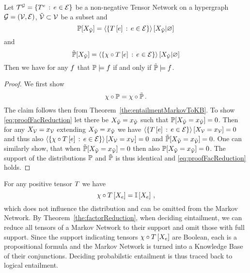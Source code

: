 \begin{theorem}\label{the:factorReduction}
	Let $\mathcal{T}^{\mathcal{G}}=\{T^{e}\, : \, e\in\mathcal{E}\}$ be a non-negative Tensor Network on a hypergraph $\mathcal{G}=(\mathcal{V},\mathcal{E})$, $\tilde{\mathcal{V}}\subset\mathcal{V}$ be a subset and
		\[ \mathbb{P}[X_{\tilde{\mathcal{V}}}] = \left\langle \{T\left[e\right] \, : \, e\in\mathcal{E} \}\right\rangle \left[ X_{\tilde{\mathcal{V}}} | \varnothing \right] \]
	and
		\[ \tilde{\mathbb{P}}[X_{\tilde{\mathcal{V}}}] = \left\langle \{\chi \circ T\left[e\right] \, : \, e\in\mathcal{E} \}\right\rangle \left[ X_{\tilde{\mathcal{V}}} | \varnothing \right] \]
	Then we have for any $f$ that $\mathbb{P}\models f$ if and only if $\tilde{\mathbb{P}}\models f$.
\end{theorem}
\begin{proof}
	We first show
	\begin{align}\label{eq:proofFacReduction}
		 \chi\circ\mathbb{P} = \chi\circ\tilde{\mathbb{P}} \, . 
	\end{align}
	The claim follows then from Theorem~\ref{the:entailmentMarkovToKB}.
	To show \eqref{eq:proofFacReduction} let there be $X_{\tilde{\mathcal{V}}}=x_{\tilde{\mathcal{V}}}$ such that $\mathbb{P}[X_{\tilde{\mathcal{V}}}=x_{\tilde{\mathcal{V}}}]=0$.
	Then for any $X_{\mathcal{V}}=x_{\mathcal{V}}$ extending  $X_{\tilde{\mathcal{V}}}=x_{\tilde{\mathcal{V}}}$ we have $\left\langle \{T\left[e\right] \, : \, e\in\mathcal{E} \}\right\rangle \left[ X_{\mathcal{V}}=x_{\mathcal{V}} \right] = 0$ and thus also $\left\langle \{\chi\circ T\left[e\right] \, : \, e\in\mathcal{E} \}\right\rangle \left[ X_{\mathcal{V}}=x_{\mathcal{V}} \right] = 0$ and $\tilde{\mathbb{P}}[X_{\tilde{\mathcal{V}}}=x_{\tilde{\mathcal{V}}}]=0$.
	One can similarly show, that when $\tilde{\mathbb{P}}[X_{\tilde{\mathcal{V}}}=x_{\tilde{\mathcal{V}}}]=0$ then also ${\mathbb{P}}[X_{\tilde{\mathcal{V}}}=x_{\tilde{\mathcal{V}}}]=0$. 
	The support of the distributions $\mathbb{P}$ and $\tilde{\mathbb{P}}$ is thus identical and \eqref{eq:proofFacReduction} holds.
\end{proof}

For any positive tensor $T$ we have
	\[ \chi\circ T\left[X_{e}\right] = \mathbb{I}\left[X_{e}\right] \, , \]
which does not influence the distribution and can be omitted from the Markov Network.
By Theorem~\ref{the:factorReduction}, when deciding eintailment, we can reduce all tensors of a Markov Network to their support and omit those with full support.
Since the support indicating tensors $\chi\circ T\left[X_{e}\right]$ are Boolean, each is a propositional formula and the Markov Network is turned into a Knowledge Base of their conjunctions.
Deciding probabilstic entailment is thus traced back to logical entailment.

